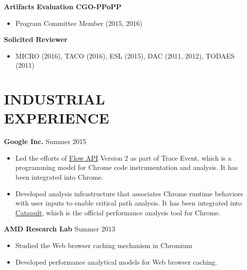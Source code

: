 \documentclass[margin, 9pt]{res} %
\begin{document}
\begin{resume}
\medskip
\textbf{Artifacts Evaluation CGO-PPoPP}\\
\vspace*{-10pt}
\begin{itemize}[leftmargin=*] \itemsep -3pt
\vspace*{-5pt}
	\item Program Committee Member (2015, 2016) \par
\end{itemize}

\medskip
\textbf{Solicited Reviewer}\\
\vspace*{-10pt}
\begin{itemize}[leftmargin=*] \itemsep -3pt
\vspace*{-5pt}
    \item MICRO (2016), TACO (2016), ESL (2015), DAC (2011, 2012), TODAES (2011)
\end{itemize}


\section{INDUSTRIAL\\ EXPERIENCE} 

{\textbf{Google Inc.}} \hfill{Summer 2015}\\
\vspace*{-10pt}
\begin{itemize}[leftmargin=*] \itemsep -3pt
\vspace*{-5pt}
	\item Led the efforts of
\href{https://docs.google.com/document/d/1La_0PPfsTqHJihazYhff96thhjPtvq1KjAUOJu0dvEg/edit#heading=h.46jecek204ph}{Flow
API} Version 2 as part of Trace Event, which is a programming model for Chrome
code instrumentation and analysis. It has been integrated into Chrome.
	\item Developed analysis infrastructure that associates Chrome runtime
behaviors with user inputs to enable critical path analysis. It has been integrated into \href{https://github.com/catapult-project/catapult}{Catapult}, which is the official performance analysis tool for Chrome.
\end{itemize}

\medskip
{\textbf{AMD Research Lab}} \hfill{Summer 2013}\\
\vspace*{-10pt}
\begin{itemize}[leftmargin=*] \itemsep -3pt
\vspace*{-5pt}
	\item Studied the Web browser caching mechanism in Chromium
	\item Developed performance analytical models for Web browser caching.
\end{itemize}


\end{resume}
\end{document}
